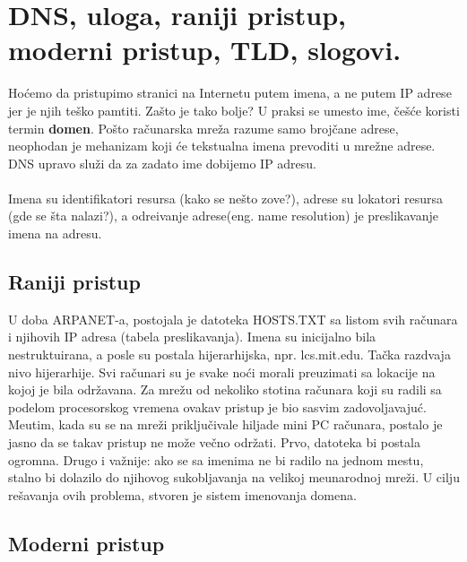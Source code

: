 \documentclass{article} %
\begin{document}
%
%

\section{DNS, uloga, raniji pristup, moderni pristup, TLD, slogovi.}

Ho\' cemo da pristupimo stranici na Internetu putem imena, a ne putem IP adrese jer je njih te\v sko pamtiti. Za\v sto je tako bolje?  U praksi se umesto ime, \v ce\v s\' ce koristi termin \textbf{domen}. Po\v sto ra\v cunarska mre\v za razume samo broj\v cane adrese, neophodan  je mehanizam koji \' ce tekstualna imena prevoditi u mre\v zne adrese. DNS upravo slu\v zi da za zadato ime dobijemo IP adresu.
\\
\\Imena su identifikatori resursa (kako se ne\v sto zove?), adrese su lokatori resursa (gde se \v sta nalazi?), a odre\dj ivanje adrese(eng. name resolution) je preslikavanje imena na adresu.

\subsection{Raniji pristup}

U doba ARPANET-a, postojala je datoteka HOSTS.TXT sa listom svih ra\v cunara i njihovih IP adresa (tabela preslikavanja). Imena su inicijalno bila nestruktuirana, a posle su postala hijerarhijska, npr. lcs.mit.edu. Ta\v cka razdvaja nivo hijerarhije. Svi ra\v cunari su je svake no\' ci morali preuzimati sa lokacije na kojoj je bila odr\v zavana. Za mre\v zu od nekoliko stotina ra\v cunara koji su radili sa podelom procesorskog vremena ovakav pristup je bio sasvim zadovoljavaju\' c. Me\dj utim, kada su se na mre\v zi priklju\v civale hiljade mini PC ra\v cunara, postalo je jasno da se takav pristup ne mo\v ze ve\v cno odr\v zati. Prvo, datoteka  bi postala ogromna. Drugo i va\v znije:  ako se sa imenima ne bi radilo na jednom mestu, stalno bi dolazilo do  njihovog sukobljavanja  na velikoj me\dj unarodnoj mre\v zi. U cilju re\v savanja ovih problema, stvoren je sistem imenovanja domena. 

\subsection{Moderni pristup}
 
\end{document}

